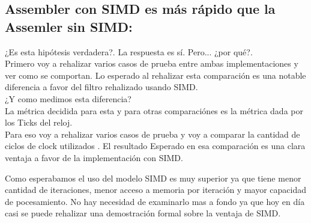 \subsection{Assembler con SIMD es más rápido que la Assemler sin SIMD:}

¿Es esta hipótesis verdadera?. La respuesta es sí. Pero... ¿por qué?. \\
Primero voy a rehalizar varios casos de prueba entre ambas implementaciones y ver como se comportan. Lo esperado al rehalizar esta comparación es una notable diferencia a favor del filtro rehalizado usando SIMD.\\
¿Y como medimos esta diferencia?\\
 La métrica decidida para esta y para otras comparaciónes es la métrica dada por los Ticks del reloj.\\
 Para eso voy a rehalizar varios casos de prueba y voy a comparar la cantidad de ciclos de clock utilizados . El resultado Esperado en esa comparación es una clara ventaja a favor de la implementación con SIMD.

 Como esperabamos el uso del modelo SIMD es muy superior ya que tiene menor cantidad de iteraciones, menor acceso a memoria por iteración y mayor capacidad de pocesamiento. No hay necesidad de examinarlo mas a fondo ya que hoy en día casi se puede rehalizar una demostración formal sobre la ventaja de SIMD.\\

